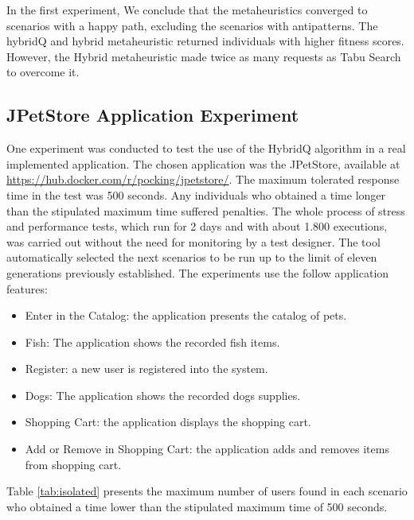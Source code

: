 \documentclass{bmcart}
\begin{document}
In the first experiment, We conclude that the metaheuristics converged to scenarios with a happy path, excluding the scenarios with antipatterns. The hybridQ and hybrid metaheuristic returned individuals with higher fitness scores. However, the Hybrid metaheuristic made twice as many requests as Tabu Search to overcome it. 



\subsection{JPetStore Application Experiment}

One experiment was conducted to test the use of the HybridQ algorithm in a real implemented application. The chosen application was the JPetStore, available at \url{https://hub.docker.com/r/pocking/jpetstore/}. The maximum tolerated response time in the test was 500 seconds.  Any  individuals who obtained a time longer than the stipulated maximum time suffered penalties.  The whole process of stress and performance tests, which run for 2 days and  with about 1.800 executions, was carried out without the need for monitoring by a test designer. The tool automatically selected the next scenarios to be run up to the limit of eleven generations previously established. The experiments use the follow application features:


\begin{itemize}
\item Enter in the Catalog: the application presents the catalog of pets.
\item Fish: The application shows the recorded fish items.
\item Register:  a new user is registered into the system.
\item Dogs: The application shows the recorded dogs supplies.
\item Shopping Cart: the application displays the shopping cart.
\item Add or Remove in Shopping Cart: the application adds and removes items from shopping cart.
\end{itemize}

Table \ref{tab:isolated} presents the maximum number of users found in each scenario who obtained a time lower than the stipulated maximum time of 500 seconds.
\end{document}

